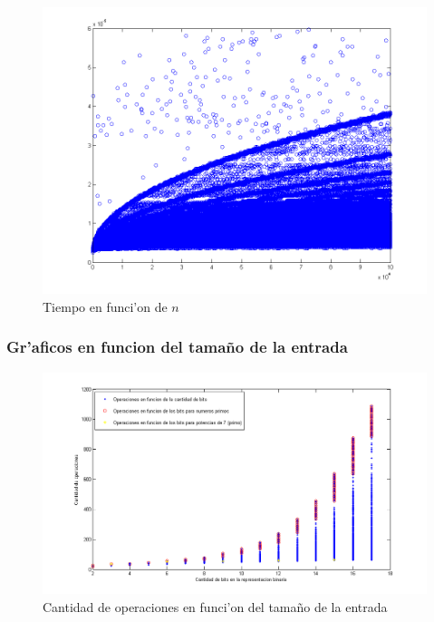\begin{figure}[H]
\centering
\includegraphics[scale=0.5]{../../codigo/ejercicio1/benchmark_de_tiempo/graficos/todos_los_numeros/todosLosNumerosPuntosTiempo.png}
\caption{Tiempo en funci'on de $n$}
\label{Ej1fig4}
\end{figure}

\subsubsection{Gr'aficos en funcion del tama\~{n}o de la entrada}
\begin{figure}[H]
\centering
\includegraphics[scale=0.7]{../../codigo/ejercicio1/benchmark/graficos/tamanio_Entrada_T/operacionesEntrada.png}
\caption{Cantidad de operaciones en funci'on del tama\~{n}o de la entrada}
\label{Ej1fig5}
\end{figure}


